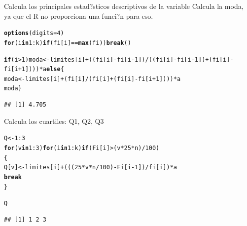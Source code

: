 \documentclass[10pt,a4paper]{article}\usepackage[]{graphicx}\usepackage[]{color}
\makeatletter
\newcommand{\hlnum}[1]{\textcolor[rgb]{0.686,0.059,0.569}{#1}}%
\newcommand{\hlopt}[1]{\textcolor[rgb]{0,0,0}{#1}}%
\newcommand{\hlstd}[1]{\textcolor[rgb]{0.345,0.345,0.345}{#1}}%
\newcommand{\hlkwa}[1]{\textcolor[rgb]{0.161,0.373,0.58}{\textbf{#1}}}%
\newcommand{\hlkwb}[1]{\textcolor[rgb]{0.69,0.353,0.396}{#1}}%
\newcommand{\hlkwc}[1]{\textcolor[rgb]{0.333,0.667,0.333}{#1}}%
\newcommand{\hlkwd}[1]{\textcolor[rgb]{0.737,0.353,0.396}{\textbf{#1}}}%
\newenvironment{kframe}{%
 \def\at@end@of@kframe{}%
 \ifinner\ifhmode%
  \def\at@end@of@kframe{\end{minipage}}%
  \begin{minipage}{\columnwidth}%
 \fi\fi%
 \def\FrameCommand##1{\hskip\@totalleftmargin \hskip-\fboxsep
 \colorbox{shadecolor}{##1}\hskip-\fboxsep
     \hskip-\linewidth \hskip-\@totalleftmargin \hskip\columnwidth}%
 \MakeFramed {\advance\hsize-\width
   \@totalleftmargin\z@ \linewidth\hsize
   \@setminipage}}%
 {\par\unskip\endMakeFramed%
 \at@end@of@kframe}
\newenvironment{knitrout}{}{} %
\makeatother
\begin{document}
Calcula los principales estad?sticos descriptivos de la variable 
Calcula la moda, ya que el R no proporciona una funci?n para eso. 
\begin{knitrout}
\color{fgcolor}\begin{kframe}
\begin{alltt}
\hlkwd{options}\hlstd{(}\hlkwc{digits}\hlstd{=}\hlnum{4}\hlstd{)}
\hlkwa{for}\hlstd{(i} \hlkwa{in} \hlnum{1}\hlopt{:}\hlstd{k)} \hlkwa{if} \hlstd{(fi[i]} \hlopt{==} \hlkwd{max}\hlstd{(fi))} \hlkwa{break}\hlstd{()}

\hlkwa{if}\hlstd{(i} \hlopt{>} \hlnum{1}\hlstd{) moda} \hlkwb{<-} \hlstd{limites[i]}\hlopt{+}\hlstd{((fi[i]}\hlopt{-}\hlstd{fi[i}\hlopt{-}\hlnum{1}\hlstd{])}\hlopt{/}\hlstd{((fi[i]}\hlopt{-}\hlstd{fi[i}\hlopt{-}\hlnum{1}\hlstd{])}\hlopt{+}\hlstd{(fi[i]}\hlopt{-}\hlstd{fi[i}\hlopt{+}\hlnum{1}\hlstd{]) ))}\hlopt{*}\hlstd{a} \hlkwa{else} \hlstd{\{}
\hlstd{moda} \hlkwb{<-} \hlstd{limites[i]}\hlopt{+}\hlstd{(fi[i]}\hlopt{/}\hlstd{(fi[i]}\hlopt{+}\hlstd{(fi[i]}\hlopt{-}\hlstd{fi[i}\hlopt{+}\hlnum{1}\hlstd{])))}\hlopt{*}\hlstd{a}
\hlstd{moda \}}
\end{alltt}
\begin{verbatim}
## [1] 4.705
\end{verbatim}
\end{kframe}
\end{knitrout}

 Calcula los cuartiles: Q1, Q2, Q3 
\begin{knitrout}
\color{fgcolor}\begin{kframe}
\begin{alltt}
\hlstd{Q} \hlkwb{<-} \hlnum{1}\hlopt{:}\hlnum{3}
\hlkwa{for}\hlstd{(v} \hlkwa{in} \hlnum{1}\hlopt{:}\hlnum{3}\hlstd{)} \hlkwa{for}\hlstd{(i} \hlkwa{in} \hlnum{1}\hlopt{:}\hlstd{k)} \hlkwa{if} \hlstd{(Fi[i]} \hlopt{>} \hlstd{(v}\hlopt{*}\hlnum{25}\hlopt{*}\hlstd{n)}\hlopt{/}\hlnum{100}\hlstd{)}
\hlstd{\{}
  \hlstd{Q[v]} \hlkwb{<-} \hlstd{limites[i]}\hlopt{+}\hlstd{(((}\hlnum{25}\hlopt{*}\hlstd{v}\hlopt{*}\hlstd{n}\hlopt{/}\hlnum{100}\hlstd{)}\hlopt{-}\hlstd{Fi[i}\hlopt{-}\hlnum{1}\hlstd{])}\hlopt{/}\hlstd{fi[i])}\hlopt{*}\hlstd{a}
  \hlkwa{break}
\hlstd{\}}
\end{alltt}


{\ttfamily\noindent\bfseries\color{errorcolor}{\#\# Error in Q[v] <- limites[i] + (((25 * v * n/100) - Fi[i - 1])/fi[i]) * : replacement has length zero}}\begin{alltt}
\hlstd{Q}
\end{alltt}
\begin{verbatim}
## [1] 1 2 3
\end{verbatim}
\end{kframe}
\end{knitrout}
\end{document}

